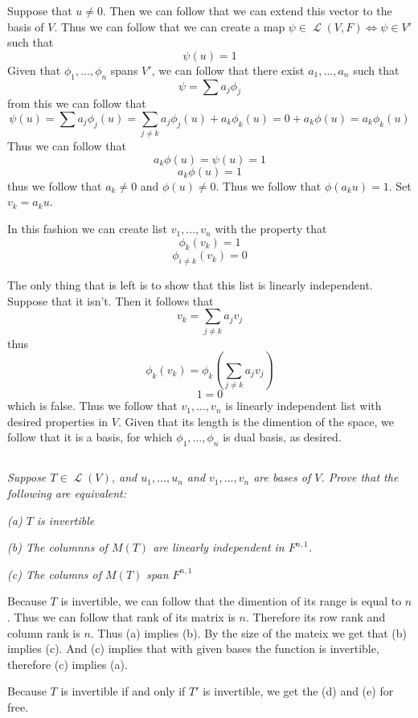 \documentclass[11pt,oneside,titlepage]{book}
\DeclareMathOperator \map {\mathcal {L}}
\begin{document}
Suppose that $u \neq 0$. Then we can follow that we can extend this vector to the basis of $V$.
Thus we can follow that we can create a map $\psi \in \map(V, F) \iff \psi \in V'$ such that
$$\psi(u) = 1$$
Given that $\phi_1, ..., \phi_n$ spans $V'$, we can follow that there exist $a_1, ..., a_n$
such that
$$\psi = \sum {a_j \phi_j}$$
from this we can follow that
$$\psi(u) = \sum {a_j \phi_j}(u) = \sum_{j \neq k} {a_j \phi_j}(u) + a_k \phi_k(u) = 0 +
a_k \phi(u) = a_k \phi_k(u)$$
Thus we can follow that
$$a_k \phi(u) = \psi(u) = 1$$
$$a_k \phi(u) = 1$$
thus we follow that $a_k \neq 0$ and $\phi(u) \neq 0$. Thus we follow that $\phi(a_k u) = 1$.
Set $v_k = a_k u$.

In this fashion we can create list $v_1, ..., v_n$ with the property that
$$\phi_k (v_k) = 1$$
$$\phi_{i \neq k}(v_k) = 0$$

The only thing that is left is to show that this list is linearly independent.
Suppose that it isn't. Then it follows that
$$v_k = \sum_{j \neq k} a_j v_j$$
thus
$$\phi_k(v_k) = \phi_k(\sum_{j \neq k} a_j v_j)$$
$$1 = 0$$
which is false. Thus we follow that $v_1, ..., v_n$ is linearly independent list with desired
properties in $V$. Given that its length is the dimention of the space, we follow that
it is a basis, for which $\phi_1, ..., \phi_n$ is dual basis, as desired.

\subsection{}

\textit{Suppose $T \in \map(V)$, and $u_1, ..., u_n$ and $v_1, ..., v_n$ are bases of $V$. Prove
  that the following are equivalent: }

\textit{(a) $T$ is invertible}

\textit{(b) The columnns of $M(T)$ are linearly independent in $F^{n, 1}$.}

\textit{(c) The columns of $M(T)$ span $F^{n, 1}$}

Because $T$ is invertible, we can follow that the dimention of its range is equal to $n$.
Thus we can follow that rank of its matrix is $n$. Therefore its row rank and column rank is $n$.
Thus (a) implies (b). By the size of the mateix we get that (b) implies (c). And (c) implies that
with given bases the function is invertible, therefore (c) implies (a).

Because $T$ is invertible if and only if $T'$ is invertible,  we get the (d) and
(e) for free.
\end{document}
